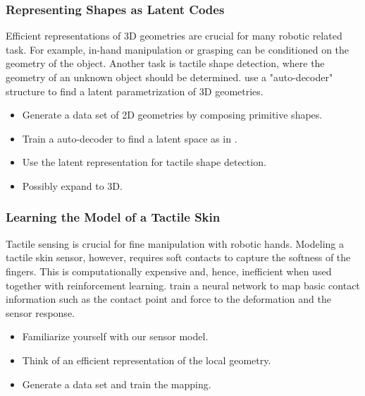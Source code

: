 \documentclass[a4paper]{article}
\begin{document}
\subsubsection{Representing Shapes as Latent Codes}
Efficient representations of 3D geometries are crucial for many robotic related task. For example, in-hand manipulation or grasping can be conditioned on the geometry of the object. Another task is tactile shape detection, where the geometry of an unknown object should be determined. \citet{park2019deepsdf} use a "auto-decoder" structure to find a latent parametrization of 3D geometries.
\begin{itemize}
  \item Generate a data set of 2D geometries by composing primitive shapes.
  \item Train a auto-decoder to find a latent space as in \cite{park2019deepsdf}.
  \item Use the latent representation for tactile shape detection.
  \item Possibly expand to 3D.
\end{itemize}

\subsubsection{Learning the Model of a Tactile Skin}
Tactile sensing is crucial for fine manipulation with robotic hands. Modeling a tactile skin sensor, however, requires soft contacts to capture the softness of the fingers. This is computationally expensive and, hence, inefficient when used together with reinforcement learning. \citet{narang2021sim} train a neural network to map basic contact information such as the contact point and force to the deformation and the sensor response. 
\begin{itemize}
  \item Familiarize yourself with our sensor model.
  \item Think of an efficient representation of the local geometry.
  \item Generate a data set and train the mapping.
\end{itemize}
\end{document}
